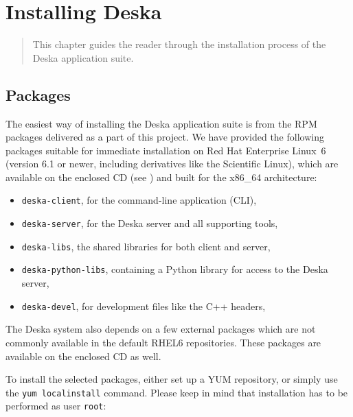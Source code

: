 \documentclass[deska]{subfiles}
\begin{document}
\chapter{Installing Deska}
\label{sec:building}

\begin{abstract}
This chapter guides the reader through the installation process of the Deska application suite.
\end{abstract}

\section{Packages}


The easiest way of installing the Deska application suite is from the RPM packages delivered as a part of this project.
We have provided the following packages suitable for immediate installation on Red Hat Enterprise Linux~6 \cite{rhel}
(version 6.1 or newer, including derivatives like the Scientific Linux), which are available on the enclosed CD (see
) and built for the x86\_64 architecture:

\begin{itemize}
    \item {\tt deska-client}, for the command-line application (CLI),
    \item {\tt deska-server}, for the Deska server and all supporting tools,
    \item {\tt deska-libs}, the shared libraries for both client and server,
    \item {\tt deska-python-libs}, containing a Python library for access to the Deska server,
    \item {\tt deska-devel}, for development files like the C++ headers,
\end{itemize}

The Deska system also depends on a few external packages which are not commonly available in the default RHEL6
repositories.  These packages are available on the enclosed CD as well.

To install the selected packages, either set up a YUM repository, or simply use the {\tt yum localinstall} command.
Please keep in mind that installation has to be performed as user {\tt root}:
\end{document}
